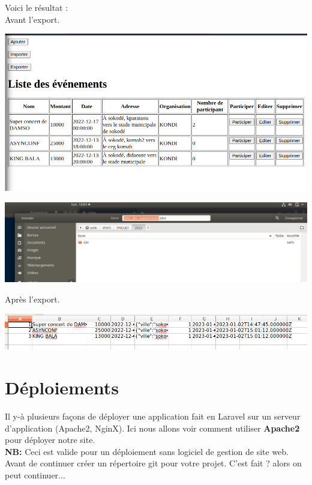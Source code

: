 \documentclass[12pt,a4paper]{article}
\begin{document}
Voici le résultat : \\
Avant l'export. \\
\begin{center}
\includegraphics[scale=0.55]{img/export_index.png}
\end{center}
\begin{center}
\includegraphics[scale=0.4]{img/export_d.png}
\end{center}
Après l'export. \\
\begin{center}
\includegraphics[scale=0.55]{img/export_file.png}
\end{center}

\section{Déploiements}
Il y-à plusieurs façons de déployer une application fait en Laravel sur un serveur d'application (Apache2, NginX). Ici nous allons voir comment utiliser \textbf{Apache2} pour
déployer notre site.\\
\textbf{NB:} Ceci est valide pour un déploiement sans logiciel de gestion de site web.\\

Avant de continuer créer un répertoire git pour votre projet. C'est fait ? alors on peut continuer...
\end{document}
